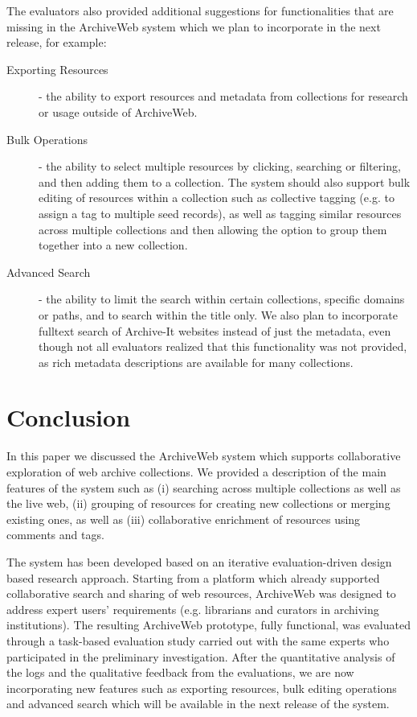 \documentclass{llncs}
\begin{document}
The evaluators also provided additional suggestions for
functionalities that are missing in the ArchiveWeb system which
we plan to incorporate in the next release, for example:
\begin{description}
\item[Exporting Resources] - the ability to export
  resources and metadata from collections for research or
  usage outside of ArchiveWeb.
\item[Bulk Operations] - the ability to select multiple resources by clicking, searching or
  filtering, and then adding them to a collection. The system should also support bulk editing of resources within a collection
  such as collective tagging (e.g. to assign a tag to multiple seed records),
  as well as tagging similar resources across multiple collections and
  then allowing the option to group them together into a new
  collection.
\item[Advanced Search] - the ability to limit the search within
  certain collections, specific domains or paths, and to search within
  the title only. We also plan to incorporate fulltext search of
  Archive-It websites instead of just the metadata, even though not
  all evaluators realized that this functionality was not
  provided, as rich metadata descriptions are available for many
  collections.
\end{description}

\section{Conclusion}\label{sec:Conclusion}

In this paper we discussed the ArchiveWeb system which supports
collaborative exploration of web archive collections. We provided a
description of the main features of the system such as (i) searching
across multiple collections as well as the live web, (ii) grouping of
resources for creating new collections or merging existing ones, as
well as (iii) collaborative enrichment of resources using comments and
tags.

The system has been developed based on an iterative evaluation-driven
design based research approach. Starting from a platform which already
supported collaborative search and sharing of web resources,
ArchiveWeb was designed to address expert users' requirements
(e.g. librarians and curators in archiving institutions). The
resulting ArchiveWeb prototype, fully functional, was evaluated
through a task-based evaluation study carried out with the same
experts who participated in the preliminary investigation. After the
quantitative analysis of the logs and the qualitative feedback from
the evaluations, we are now incorporating new features such as
exporting resources, bulk editing operations and advanced search which
will be available in the next release of the system.
\end{document}
